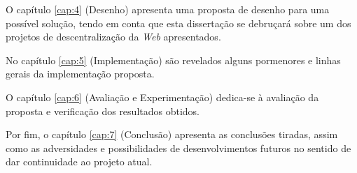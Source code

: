 O capítulo \ref{cap:4} (Desenho) apresenta uma proposta de desenho para uma possível solução, tendo em conta que esta dissertação se debruçará sobre um dos projetos de descentralização da \emph{Web} apresentados.

No capítulo \ref{cap:5} (Implementação) são revelados alguns pormenores e linhas gerais da implementação proposta.

O capítulo \ref{cap:6} (Avaliação e Experimentação) dedica-se à avaliação da proposta e verificação dos resultados obtidos.

Por fim, o capítulo \ref{cap:7} (Conclusão) apresenta as conclusões tiradas, assim como as adversidades e possibilidades de desenvolvimentos futuros no sentido de dar continuidade ao projeto atual.